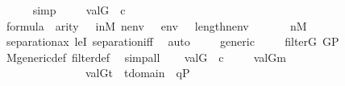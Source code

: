\begin{isabellebody}
\ \ \ \ \isamarkupfalse%
\ simp\isanewline
\ \ \isamarkupfalse%
\ \ {\isacartoucheopen}val{\isacharparenleft}{\kern0pt}G{\isacharcomma}{\kern0pt}{\isasympi}{\isacharparenright}{\kern0pt}\ {\isacharequal}{\kern0pt}\ c{\isacartoucheclose}\ \isanewline
\ \ \isamarkupfalse%
\ {\isacartoucheopen}{\isacharquery}{\kern0pt}{\isasympsi}{\isasymin}formula{\isacartoucheclose}\ \ {\isacartoucheopen}arity{\isacharparenleft}{\kern0pt}{\isacharquery}{\kern0pt}{\isasympsi}{\isacharparenright}{\kern0pt}\ {\isasymle}\ {\isacharunderscore}{\kern0pt}{\isacartoucheclose}\ in{\isacharunderscore}{\kern0pt}M\ {\isacartoucheopen}nenv\ {\isasymin}\ {\isacharunderscore}{\kern0pt}{\isacartoucheclose}\ {\isacartoucheopen}env\ {\isasymin}\ {\isacharunderscore}{\kern0pt}{\isacartoucheclose}\ {\isacartoucheopen}length{\isacharparenleft}{\kern0pt}nenv{\isacharparenright}{\kern0pt}\ {\isacharequal}{\kern0pt}\ {\isacharunderscore}{\kern0pt}{\isacartoucheclose}\ \isanewline
\ \ \isamarkupfalse%
\ {\isachardoublequoteopen}{\isacharquery}{\kern0pt}n{\isasymin}M{\isachardoublequoteclose}\ \isanewline
\ \ \ \ \isamarkupfalse%
\ separation{\isacharunderscore}{\kern0pt}ax\ leI\ separation{\isacharunderscore}{\kern0pt}iff\ \isamarkupfalse%
\ auto\ \isanewline
\ \ \isamarkupfalse%
\ generic\ \isanewline
\ \ \isamarkupfalse%
\ {\isachardoublequoteopen}filter{\isacharparenleft}{\kern0pt}G{\isacharparenright}{\kern0pt}{\isachardoublequoteclose}\ {\isachardoublequoteopen}G{\isasymsubseteq}P{\isachardoublequoteclose}\ \isanewline
\ \ \ \ \isamarkupfalse%
\ M{\isacharunderscore}{\kern0pt}generic{\isacharunderscore}{\kern0pt}def\ filter{\isacharunderscore}{\kern0pt}def\ \isamarkupfalse%
\ simp{\isacharunderscore}{\kern0pt}all\isanewline
\ \ \isamarkupfalse%
\ {\isacartoucheopen}val{\isacharparenleft}{\kern0pt}G{\isacharcomma}{\kern0pt}{\isasympi}{\isacharparenright}{\kern0pt}\ {\isacharequal}{\kern0pt}\ c{\isacartoucheclose}\ \isanewline
\ \ \isamarkupfalse%
\ {\isachardoublequoteopen}val{\isacharparenleft}{\kern0pt}G{\isacharcomma}{\kern0pt}{\isacharquery}{\kern0pt}m{\isacharparenright}{\kern0pt}\ {\isacharequal}{\kern0pt}\isanewline
\ \ \ \ \ \ \ \ \ \ \ \ \ \ \ {\isacharbraceleft}{\kern0pt}val{\isacharparenleft}{\kern0pt}G{\isacharcomma}{\kern0pt}t{\isacharparenright}{\kern0pt}\ {\isachardot}{\kern0pt}{\isachardot}{\kern0pt}\ t{\isasymin}domain{\isacharparenleft}{\kern0pt}{\isasympi}{\isacharparenright}{\kern0pt}\ {\isacharcomma}{\kern0pt}\ {\isasymexists}q{\isasymin}P\ {\isachardot}{\kern0pt}\ \ \isanewline

\end{isabellebody}
